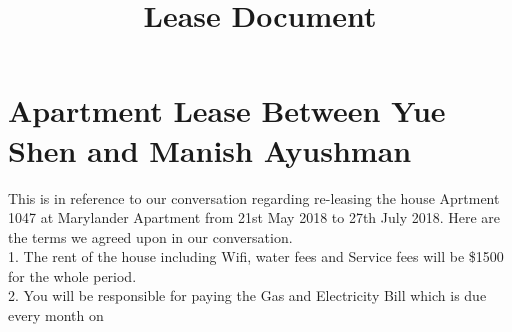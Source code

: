 \documentclass[11pt, oneside]{article}   	%
\title{Lease Document }
\begin{document}
\maketitle

\section{Apartment Lease Between Yue Shen and Manish Ayushman}

This is in reference to our conversation regarding re-leasing the house Aprtment 1047 at Marylander Apartment from 21st May 2018 to 27th July 2018. Here are the terms we agreed upon in our conversation. \\
1. The rent of the house including Wifi, water fees and Service fees will be \$1500 for the whole period.\\
2. You will be responsible for paying the Gas and Electricity Bill which is due every month on \\


\subsection{}
\end{document}
